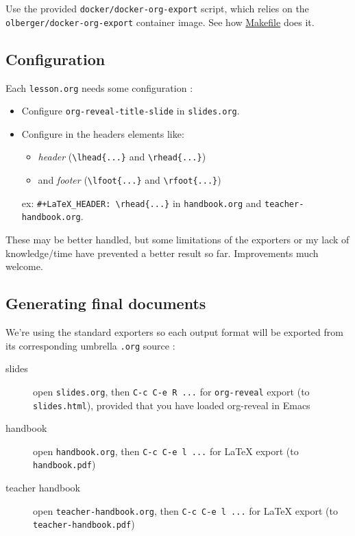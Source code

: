 \documentclass[a4paper]{article}
\begin{document}
Use the provided \texttt{docker/docker-org-export} script, which relies on
the \texttt{olberger/docker-org-export} container image. See how \url{Makefile} does it.

\subsection{Configuration}
\label{sec:org9924c2e}

Each \texttt{lesson.org} needs some configuration :
\begin{itemize}
\item Configure \texttt{org-reveal-title-slide} in \texttt{slides.org}.

\item Configure in the headers elements like:
\begin{itemize}
\item \emph{header} (\texttt{\textbackslash{}lhead\{...\}} and \texttt{\textbackslash{}rhead\{...\}})
\item and \emph{footer} (\texttt{\textbackslash{}lfoot\{...\}} and \texttt{\textbackslash{}rfoot\{...\}})
\end{itemize}

ex: \texttt{\#+LaTeX\_HEADER: \textbackslash{}rhead\{...\}} in \texttt{handbook.org} and
  \texttt{teacher-handbook.org}.
\end{itemize}

\begin{NOTES}
These may be better handled, but some limitations of the exporters or
my lack of knowledge/time have prevented a better result so
far. Improvements much welcome.
\end{NOTES}

\subsection{Generating final documents}
\label{sec:orgf3ffbf5}

We're using the standard exporters so each output format will be exported from its corresponding umbrella \texttt{.org} source :

\begin{description}
\item[{slides}] open \texttt{slides.org}, then \texttt{C-c C-e R ...} for \texttt{org-reveal} export (to \texttt{slides.html}), provided that you have loaded org-reveal in Emacs
\item[{handbook}] open \texttt{handbook.org}, then \texttt{C-c C-e l ...} for \LaTeX{} export (to \texttt{handbook.pdf})
\item[{teacher handbook}] open \texttt{teacher-handbook.org}, then \texttt{C-c C-e l ...} for \LaTeX{} export (to \texttt{teacher-handbook.pdf})
\end{description}
\end{document}
